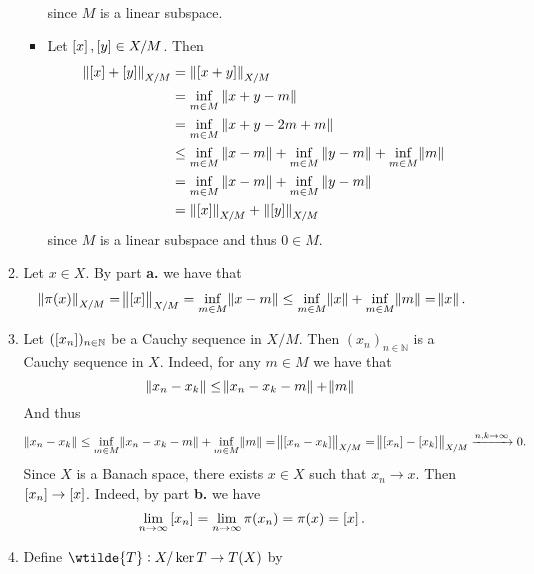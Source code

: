 \begin{enumerate}[label = \textbf{Exercise \arabic*.},wide = 0pt, itemsep = 1.5ex]
\begin{enumerate}[label = \textbf{\alph*.},wide = 0pt, itemsep = 1.5ex]
\begin{itemize}[leftmargin = *]
\begin{align*}
						\end{align*}
					\noindent since $M$ is a linear subspace.
				\item {} Let $\sbr{x},\sbr[0]{y} \in X/M$. Then 
					\begin{align*}
						\norm[0]{\sbr{x} + \sbr[0]{y}}_{X/M} &= \norm[0]{\sbr[0]{x + y}}_{X/M}\\
						&= \inf_{m \in M} \norm[0]{x + y - m}\\
						&= \inf_{m \in M} \norm[0]{x + y - 2m + m}\\
						&\leq \inf_{m \in M} \norm[0]{x - m} + \inf_{m \in M}\norm[0]{y - m} + \inf_{m \in M}\norm{m}\\
						&= \inf_{m \in M} \norm[0]{x - m} + \inf_{m \in M}\norm[0]{y - m}\\
						&= \norm[0]{\sbr{x}}_{X/M} + \norm[0]{\sbr[0]{y}}_{X/M}
					\end{align*}
					\noindent since $M$ is a linear subspace and thus $0 \in M$.
				\end{itemize}
			\item Let $x \in X$. By part \textbf{a.} we have that
				\begin{equation*}
					\norm[0]{\pi(x)}_{X/M} = \norm{\sbr{x}}_{X/M} = \inf_{m \in M} \norm{x - m} \leq \inf_{m \in M}\norm{x} + \inf_{m \in M}\norm{m} = \norm{x}.
				\end{equation*}
			\item Let $(\sbr[0]{x_n})_{n \in \mathbb{N}}$ be a Cauchy sequence in $X/M$. Then $(x_n)_{n \in \mathbb{N}}$ is a Cauchy sequence in $X$. Indeed, for any $m \in M$ we have that 
				\begin{equation*}
					\norm{x_n - x_k} \leq \norm{x_n - x_k - m} + \norm{m}
				\end{equation*}
				And thus
				\begin{equation*}
					\norm{x_n - x_k} \leq \inf_{m \in M}\norm{x_n - x_k - m} + \inf_{m \in M}\norm{m} = \norm{\sbr{x_n - x_k}}_{X/M} = \norm{\sbr{x_n} - \sbr{x_k}}_{X/M} \xrightarrow{n,k \to \infty} 0.
				\end{equation*}
				Since $X$ is a Banach space, there exists $x \in X$ such that $x_n \to x$. Then $\sbr{x_n} \to \sbr{x}$. Indeed, by part \textbf{b.} we have
				\begin{equation*}
					\lim_{n \to \infty}\sbr{x_n} = \lim_{n \to \infty}\pi(x_n) = \pi(x) = \sbr{x}.
				\end{equation*}
			\item Define $\wtilde{T} : X/\ker T \to T(X)$ by 

\end{enumerate}
\end{enumerate}
